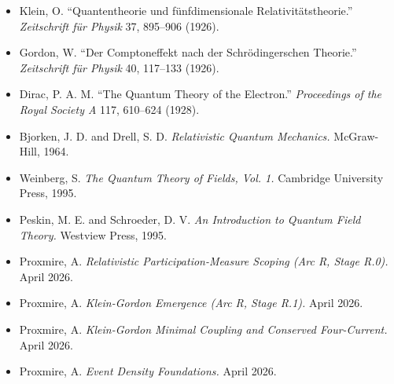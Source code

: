 \documentclass[11pt,a4paper]{article}
\begin{document}
\begin{itemize}[leftmargin=*,itemsep=2pt]
  \item Klein, O. ``Quantentheorie und f\"unfdimensionale Relativit\"atstheorie.'' \emph{Zeitschrift f\"ur Physik} 37, 895--906 (1926).
  \item Gordon, W. ``Der Comptoneffekt nach der Schr\"odingerschen Theorie.'' \emph{Zeitschrift f\"ur Physik} 40, 117--133 (1926).
  \item Dirac, P. A. M. ``The Quantum Theory of the Electron.'' \emph{Proceedings of the Royal Society A} 117, 610--624 (1928).
  \item Bjorken, J. D. and Drell, S. D. \emph{Relativistic Quantum Mechanics.} McGraw-Hill, 1964.
  \item Weinberg, S. \emph{The Quantum Theory of Fields, Vol. 1.} Cambridge University Press, 1995.
  \item Peskin, M. E. and Schroeder, D. V. \emph{An Introduction to Quantum Field Theory.} Westview Press, 1995.
  \item Proxmire, A. \emph{Relativistic Participation-Measure Scoping (Arc R, Stage R.0).} April 2026.
  \item Proxmire, A. \emph{Klein-Gordon Emergence (Arc R, Stage R.1).} April 2026.
  \item Proxmire, A. \emph{Klein-Gordon Minimal Coupling and Conserved Four-Current.} April 2026.
  \item Proxmire, A. \emph{Event Density Foundations.} April 2026.
\end{itemize}
\end{document}
